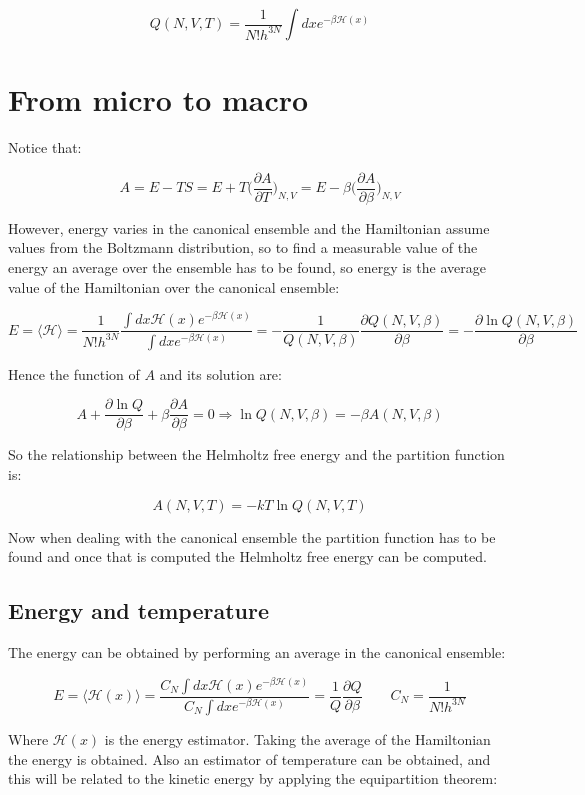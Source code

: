 		$$Q(N, V, T) = \frac{1}{N!h^{3N}}\int dx e^{-\beta\mathcal{H}(x)}$$

\section{From micro to macro}
Notice that:

$$A = E-TS = E+T\biggl(\frac{\partial A}{\partial T}\biggr)_{N, V} = E-\beta\biggl(\frac{\partial A}{\partial \beta}\biggr)_{N, V}$$

However, energy varies in the canonical ensemble and the Hamiltonian assume values from the Boltzmann distribution, so to find a measurable value of the energy an average over the ensemble has to be found, so energy is the average value of the Hamiltonian over the canonical ensemble:

$$E = \langle\mathcal{H}\rangle = \frac{1}{N!h^{3N}}\frac{\int dx\mathcal{H}(x)e^{-\beta\mathcal{H}(x)}}{\int dx e^{-\beta\mathcal{H}(x)}} = -\frac{1}{Q(N, V, \beta)}\frac{\partial Q(N, V, \beta)}{\partial \beta} = -\frac{\partial\ln Q(N, V, \beta)}{\partial \beta}$$

Hence the function of $A$ and its solution are:

$$A + \frac{\partial \ln Q}{\partial \beta} +\beta\frac{\partial A}{\partial \beta} = 0\Rightarrow \ln Q(N, V, \beta)  = -\beta A(N, V, \beta)$$

So the relationship between the Helmholtz free energy and the partition function is:

$$A(N, V, T) = -kT\ln Q(N, V, T)$$

Now when dealing with the canonical ensemble the partition function has to be found and once that is computed the Helmholtz free energy can be computed.

	\subsection{Energy and temperature}
	The energy can be obtained by performing an average in the canonical ensemble:

	$$E = \langle\mathcal{H}(x)\rangle = \frac{C_N\int dx\mathcal{H}(x)e^{-\beta\mathcal{H}(x)}}{C_N\int dxe^{-\beta\mathcal{H}(x)}} = \frac{1}{Q}\frac{\partial Q}{\partial \beta}\qquad C_N=\frac{1}{N!h^{3N}}$$

	Where $\mathcal{H}(x)$ is the energy estimator.
	Taking the average of the Hamiltonian the energy is obtained.
	Also an estimator of temperature can be obtained, and this will be related to the kinetic energy by applying the equipartition theorem:


